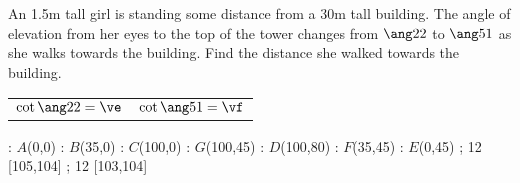

\DEGREESCOT\va\vc
\DEGREESCOT\vb\vd
\ROUND[2]\vc\ve
\ROUND[2]\vd\vf

\SUBTRACT\ve\vf\vg
\MULTIPLY{}\vh
\ROUND[2]\vh\vi

\question[3] An 1.5m tall girl is standing some distance from a 30m tall building.
The angle of elevation from her eyes to the top of the tower changes from $\ang\va$
to $\ang\vb$ as she walks towards the building. Find the distance she walked towards the building.

\watchout 

\begin{calcaid}
  \begin{tabular}{c c}
    $\cot\ang\va=\ve$ & $\cot\ang\vb=\vf$ 
  \end{tabular}
\end{calcaid}

\ifprintanswers
  \begin{marginfigure}[-70pt]
      : $A$(0,0)
      : $B$(35,0)
      : $C$(100,0)
      : $G$(100,45)
      : $D$(100,80)
      : $F$(35,45)
      : $E$(0,45)
    \figdrawbegin{}
      \figdrawline [100,101,102,103,105,106,100]
      \figdrawline [101,105,104,106]
      \figdrawline [103,104]
       ; 12 [105,104] 
       ; 12 [103,104] 
    \figdrawend
    \centerline{\box\figBoxA}
  \end{marginfigure}
\fi 

